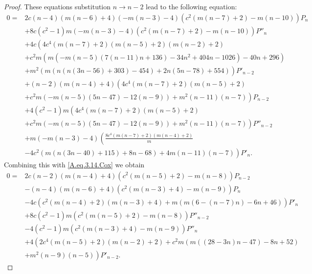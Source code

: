 \documentclass[review,nopreprintline]{elsarticle}
\theoremstyle{definition}
\numberwithin{equation}{section}
\theoremstyle{remark}
\begin{document}
\begin{proof}
	   
	These equations substitution $n\rightarrow n-2$ lead to the following equation:
	        \begin{align}
	            0=&2 c (n-4) (m (n-6)+4) (-m (n-3)-4) \left(c^2 (m (n-7)+2)-m (n-10)\right) P_n \nonumber \\
	            &+8 c \left(c^2-1\right) m (-m (n-3)-4) \left(c^2 (m (n-7)+2)-m (n-10)\right) P''_n \nonumber \\
	            &+4 c \left(4 c^4 (m (n-7)+2) (m (n-5)+2) (m (n-2)+2)\right.\nonumber\\
	            &\left.+c^2 m \left(m \left(-m (n-5) (7 (n-11) n+136)-34 n^2+404 n-1026\right)-40 n+296\right)\right.\nonumber\\
	            &\left.+m^2 (m (n (n (3 n-56)+303)-454)+2 n (5 n-78)+554)\right) P'_{n-2} \nonumber \\
	            &+(n-2) (m (n-4)+4) \left(4 c^4 (m (n-7)+2) (m (n-5)+2)\right.\nonumber\\
	            &\left.+c^2 m (-m (n-5) (5 n-47)-12 (n-9))+m^2 (n-11) (n-7)\right) P_{n-2} \nonumber \\
	            &+4 \left(c^2-1\right) m \left(4 c^4 (m (n-7)+2) (m (n-5)+2)\right.\nonumber\\
	            &\left.+c^2 m (-m (n-5) (5 n-47)-12 (n-9))+m^2 (n-11) (n-7)\right) P''_{n-2} \nonumber \\
	            &+m (-m (n-3)-4) \left(\frac{8 c^4 (m (n-7)+2) (m (n-4)+2)}{m}\right.\nonumber\\
	            &\left.-4 c^2 (m (n (3 n-40)+115)+8 n-68)+4 m (n-11) (n-7)\right)  P'_n.\label{A.eq.3.15.Cox}
	        \end{align}
	        Combining this with  \eqref{A.eq.3.14.Cox} we obtain
	        \begin{align}
	            0=&2 c (n-2) (m (n-4)+4) \left(c^2 (m (n-5)+2)-m (n-8)\right) P_{n-2} \nonumber\\
	            &-(n-4) (m (n-6)+4) \left(c^2 (m (n-3)+4)-m (n-9)\right) P_n \nonumber\\
	            &-4 c \left(c^2 (m (n-4)+2) (m (n-3)+4)+m (m (6-(n-7) n)-6 n+46)\right)  P'_n \nonumber\\
	            &+8 c \left(c^2-1\right) m \left(c^2 (m (n-5)+2)-m (n-8)\right) P''_{n-2} \nonumber\\
	            &-4 \left(c^2-1\right) m \left(c^2 (m (n-3)+4)-m (n-9)\right) P''_n \nonumber\\
	            &+4 \left(2 c^4 (m (n-5)+2) (m (n-2)+2)+c^2 m (m ((28-3 n) n-47)-8 n+52)\right.\nonumber\\
	            &\left.+m^2 (n-9) (n-5)\right) P'_{n-2}. \label{A.eq.3.16.Cox}
	        \end{align}
	       

\end{proof}
\end{document}
